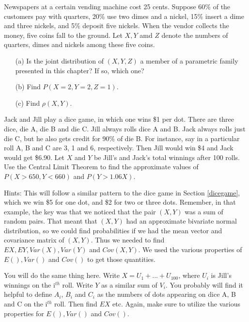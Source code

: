 \oneproblem
Newspapers at a certain vending machine cost 25 cents.  Suppose 60\% of
the customers pay with quarters, 20\% use two dimes and a nickel, 15\%
insert a dime and three nickels, and 5\% deposit five nickels.
When the vendor collects the money, five coins fall to the ground.
Let $X, Y$ amd $Z$ denote the numbers of quarters, dimes and nickels
among these five coins.

\begin{itemize}

\item [(a)] Is the joint distribution of $(X,Y,Z)$ a member of a
parametric family presented in this chapter?  If so, which one?

\item [(b)] Find $P(X = 2, Y = 2, Z = 1)$.

\item [(c)] Find $\rho(X,Y)$.

\end{itemize}

\oneproblem
Jack and Jill play a dice game, in which one wins \$1 per dot. There are
three dice, die A, die B and die C. Jill always rolls dice A and B. Jack
always rolls just die C, but he also gets credit for 90\% of die B. For
instance, say in a particular roll A, B and C are 3, 1 and 6,
respectively. Then Jill would win \$4 and Jack would get \$6.90. Let $X$
and
$Y$ be Jill's and Jack's total winnings after 100 rolls. Use the Central
Limit Theorem to find the approximate values of $P(X > 650, Y < 660)$
and
$P(Y > 1.06 X)$.

Hints: This will follow a similar pattern to the dice game in Section
\ref{dicegame}, which we win \$5 for one dot, and \$2 for two or three
dots.  Remember, in that example, the key was that we noticed that the
pair $(X,Y)$ was a sum of random pairs. That meant that $(X,Y)$ had an
approximate bivariate normal distribution, so we could find
probabilities if we had the mean vector and covariance matrix of
$(X,Y)$.  Thus we needed to find $EX, EY, Var(X), Var(Y)$ and
$Cov(X,Y)$. We used the various properties of $E(), Var()$ and $Cov()$
to get those quantities.

You will do the same thing here. Write $X = U_1+...+U_{100}$, where
$U_i$
is Jill's winnings on the i$^{th}$ roll. Write $Y$ as a similar sum of
$V_i$. You probably will find it helpful to define $A_i$, $B_i$ and
$C_i$ as the numbers of dots appearing on dice A, B and C on the
i$^{th}$ roll. Then find $EX$ etc.  Again, make sure to utilize the
various properties for $E(), Var()$ and $Cov()$.

